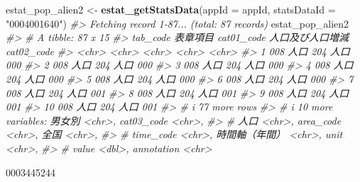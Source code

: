\documentclass[
  xelatex, ja=standard]{bxjsbook}
\newenvironment{Shaded}{\begin{snugshade}}{\end{snugshade}}
\newcommand{\AttributeTok}[1]{\textcolor[rgb]{0.13,0.29,0.53}{#1}}
\newcommand{\CommentTok}[1]{\textcolor[rgb]{0.56,0.35,0.01}{\textit{#1}}}
\newcommand{\FunctionTok}[1]{\textcolor[rgb]{0.13,0.29,0.53}{\textbf{#1}}}
\newcommand{\NormalTok}[1]{#1}
\newcommand{\OtherTok}[1]{\textcolor[rgb]{0.56,0.35,0.01}{#1}}
\newcommand{\StringTok}[1]{\textcolor[rgb]{0.31,0.60,0.02}{#1}}
\theoremstyle{definition}
\theoremstyle{definition}
\theoremstyle{definition}
\theoremstyle{definition}
\theoremstyle{remark}
\begin{document}
\begin{Shaded}
\begin{Highlighting}[]
\NormalTok{estat\_pop\_alien2 }\OtherTok{\textless{}{-}} \FunctionTok{estat\_getStatsData}\NormalTok{(}\AttributeTok{appId =}\NormalTok{ appId, }\AttributeTok{statsDataId =} \StringTok{"0004001640"}\NormalTok{)}
\CommentTok{\#\textgreater{} Fetching record 1{-}87... (total: 87 records)}
\NormalTok{estat\_pop\_alien2}
\CommentTok{\#\textgreater{} \# A tibble: 87 x 15}
\CommentTok{\#\textgreater{}    tab\_code 表章項目 cat01\_code 人口及び人口増減 cat02\_code}
\CommentTok{\#\textgreater{}    \textless{}chr\textgreater{}    \textless{}chr\textgreater{}    \textless{}chr\textgreater{}      \textless{}chr\textgreater{}            \textless{}chr\textgreater{}     }
\CommentTok{\#\textgreater{}  1 008      人口     204        人口             000       }
\CommentTok{\#\textgreater{}  2 008      人口     204        人口             000       }
\CommentTok{\#\textgreater{}  3 008      人口     204        人口             000       }
\CommentTok{\#\textgreater{}  4 008      人口     204        人口             000       }
\CommentTok{\#\textgreater{}  5 008      人口     204        人口             000       }
\CommentTok{\#\textgreater{}  6 008      人口     204        人口             000       }
\CommentTok{\#\textgreater{}  7 008      人口     204        人口             001       }
\CommentTok{\#\textgreater{}  8 008      人口     204        人口             001       }
\CommentTok{\#\textgreater{}  9 008      人口     204        人口             001       }
\CommentTok{\#\textgreater{} 10 008      人口     204        人口             001       }
\CommentTok{\#\textgreater{} \# i 77 more rows}
\CommentTok{\#\textgreater{} \# i 10 more variables: 男女別 \textless{}chr\textgreater{}, cat03\_code \textless{}chr\textgreater{},}
\CommentTok{\#\textgreater{} \#   人口 \textless{}chr\textgreater{}, area\_code \textless{}chr\textgreater{}, 全国 \textless{}chr\textgreater{},}
\CommentTok{\#\textgreater{} \#   time\_code \textless{}chr\textgreater{}, \textasciigrave{}時間軸（年間）\textasciigrave{} \textless{}chr\textgreater{}, unit \textless{}chr\textgreater{},}
\CommentTok{\#\textgreater{} \#   value \textless{}dbl\textgreater{}, annotation \textless{}chr\textgreater{}}
\end{Highlighting}
\end{Shaded}

0003445244
\end{document}
